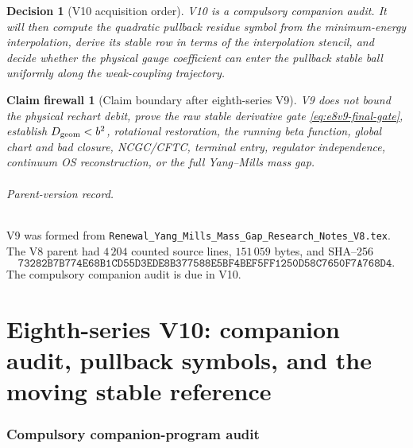 \documentclass[11pt,oneside]{book}
\newtheorem{firewall}[theorem]{Claim firewall}
\newtheorem{decision}[theorem]{Decision}
\theoremstyle{definition}
\theoremstyle{remark}
\begin{document}
\begin{decision}[V10 acquisition order]
\label{dec:e8v9-V10}
V10 is a compulsory companion audit.  It will then compute the
quadratic pullback residue symbol from the minimum-energy
interpolation, derive its stable row in terms of the interpolation
stencil, and decide whether the physical gauge coefficient can enter
the pullback stable ball uniformly along the weak-coupling
trajectory.
\end{decision}

\begin{firewall}[Claim boundary after eighth-series V9]
\label{fire:e8v9-claim}
V9 does not bound the physical rechart debit, prove the raw stable
derivative gate \eqref{eq:e8v9-final-gate}, establish
\(D_{\rm geom}<b^2\), rotational restoration, the running beta
function, global chart and bad closure, NCGC/CFTC, terminal entry,
regulator independence, continuum OS reconstruction, or the full
Yang--Mills mass gap.
\end{firewall}

\paragraph{Parent-version record.}
V9 was formed from
\texttt{Renewal\_Yang\_Mills\_Mass\_Gap\_Research\_Notes\_V8.tex}.
The V8 parent had \(4\,204\) counted source lines,
\(151\,059\) bytes, and SHA--256
\[
\texttt{73282B7B774E68B1CD55D3EDE8B377588E5BF4BEF5FF1250D58C7650F7A768D4}.
\]
The compulsory companion audit is due in V10.



\part{Eighth-series V10: companion audit, pullback symbols, and the
moving stable reference}
\label{part:e8v10}

\section{Compulsory companion-program audit}
\label{sec:e8v10-audit}
\end{document}
